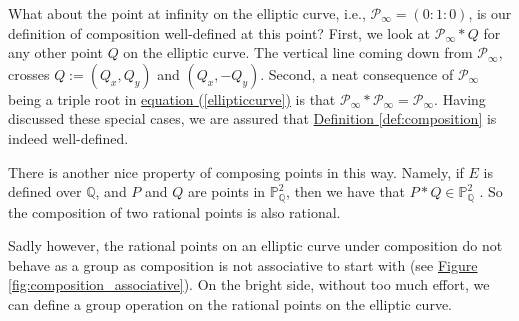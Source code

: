 \documentclass[openany, a4paper, 10pt]{book}
\theoremstyle{plain}
\theoremstyle{plain}
\theoremstyle{plain}
\theoremstyle{definition}
\theoremstyle{plain}
\theoremstyle{definition}
\theoremstyle{remark}
\renewcommand{\eqref}[1]{\hyperref[#1]{equation (\ref{#1})}}
\newcommand{\figref}[1]{\hyperref[#1]{Figure \ref{#1}}}
\newcommand{\defref}[1]{\hyperref[#1]{Definition \ref{#1}}}
\begin{document}
What about the point at infinity on the elliptic curve, i.e., $\mathcal P_\infty = (0:1:0)$, is our definition of composition well-defined at this point?
First, we look at $\mathcal P_\infty * Q$ for any other point $Q$ on the elliptic curve.
The vertical line coming down from $\mathcal P_\infty$, crosses $Q:= (Q_x, Q_y)$ and $(Q_x, -Q_y)$.
Second, a neat consequence of $\mathcal P_\infty$ being a triple root in \eqref{ellipticcurve} is that $\mathcal P_\infty * \mathcal P_\infty = \mathcal P_\infty$.
Having discussed these special cases, we are assured that \defref{def:composition} is indeed well-defined.

There is another nice property of composing points in this way.
Namely, if $E$ is defined over $\mathbb Q$, and $P$ and $Q$ are points in $\mathbb P_{\mathbb Q}^2$, then we have that $P * Q \in \mathbb P_{\mathbb Q}^2$ \cite{third_rational_point}.
So the composition of two rational points is also rational.

Sadly however, the rational points on an elliptic curve under composition do not behave as a group as composition is not associative to start with (see \figref{fig:composition_associative}).
On the bright side, without too much effort, we can define a group operation on the rational points on the elliptic curve.
\end{document}
